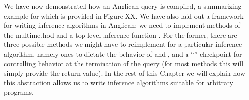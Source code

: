 We have now demonstrated how an Anglican query is compiled, a summarizing example for which
is provided in Figure XX.  We have also laid out a framework for
writing inference algorithms in Anglican: we need to implement methods of the \checkpoint multimethod
and a top level inference function \anginfer.  For the former, there are three possible \checkpoint methods
we might have to reimplement for a particular inference algorithm, namely ones to dictate the behavior
of \sample and \observe, and a ``'' checkpoint for controlling behavior at the termination of
the query (for most methods this will simply provide the return value).  In the rest of this Chapter we will
explain how this abstraction allows us to write inference algorithms suitable for arbitrary programs.
